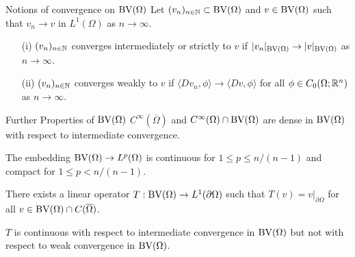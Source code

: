 \begin{frame}{Notions of convergence on $\textup{BV}(\Omega)$}
  Let $(v_n)_{n\in\mathbb{N}}\subset \textup{BV}(\Omega)$ and $v\in \textup{BV}(\Omega)$ such that
  $v_n\rightarrow v$ in $L^1(\Omega)$ as $n\rightarrow\infty$.
  \pause
  \begin{itemize}
    \item[(i)]
      $(v_n)_{n\in\mathbb{N}}$ converges intermediately or strictly to $v$
      if $|v_n|_{\textup{BV}(\Omega)}\rightarrow |v|_{\textup{BV}(\Omega)}$ as
      $n\rightarrow\infty$.
      \pause
    \item[(ii)] $(v_n)_{n\in\mathbb{N}}$ converges weakly to
      $v$ if
      $\langle Dv_n,\phi\rangle\rightarrow \langle Dv,\phi\rangle$ 
      for all $\phi\in C_0(\Omega;\mathbb{R}^n)$ as 
      $n\rightarrow\infty$.
  \end{itemize}
\end{frame}

\begin{frame}{Further Properties of $\textup{BV}(\Omega)$}
  $C^\infty(\overline\Omega)$ and $C^\infty(\Omega)\cap\textup{BV}(\Omega)$ are dense
  in $\textup{BV}(\Omega)$ with respect to intermediate convergence.
  
  \pause
  \bigskip

  The embedding $\textup{BV}(\Omega)\to L^p(\Omega)$ is continuous for
  $1\leq p\leq n/(n-1)$ and compact for $1\leq p< n/(n-1)$.
  
  \pause
  \bigskip

  There exists a linear operator $T:\textup{BV}(\Omega)\to L^1(\partial\Omega)$
  such that $T(v) = v|_{\partial\Omega}$ for all $v\in\textup{BV}(\Omega)\cap
  C(\overline\Omega)$.

  $T$ is continuous with respect to intermediate convergence in $\textup{BV}(\Omega)$
  but not with respect to weak convergence in $\textup{BV}(\Omega)$. 
\end{frame}

